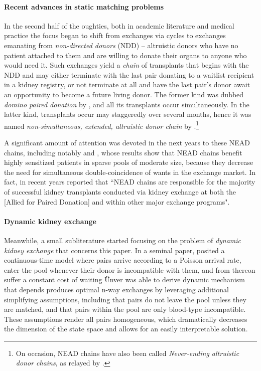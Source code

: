 \documentclass[12pt]{article}
\begin{document}
\paragraph{Recent advances in static matching problems} In the second half of the oughties, both in academic literature and medical practice the focus began to shift from exchanges via cycles to exchanges emanating from \emph{non-directed donors} (NDD) -- altruistic donors who have no patient attached to them and are willing to donate their organs to anyone who would need it. Such exchanges yield a \emph{chain} of transplants that begins with the NDD and may either terminate with the last pair donating to a waitlist recipient in a kidney registry, or not terminate at all and have the last pair's donor await an opportunity to become a future living donor. The former kind was dubbed \emph{domino paired donation} by \cite{montgomery2006domino}, and all its transplants occur simultaneously. In the latter kind, transplants occur may staggeredly over several months, hence it was named \emph{non-simultaneous, extended, altruistic donor chain} by \cite{rees2009nonsimultaneous}.\footnote{On occasion, NEAD chains have also been called \emph{Never-ending altruistic donor chains}, as relayed by \cite[p.~235-6]{roth2015gets}.}

A significant amount of attention was devoted in the next years to these NEAD chains, including notably \cite{ashlagi2011nonsimultaneous} and \cite{ashlagi2012need}, whose results show that NEAD chains benefit highly sensitized patients in sparse pools of moderate size, because they decrease the need for simultaneous double-coincidence of wants in the exchange market. In fact, in recent years \cite{anderson2015finding} reported that ``NEAD chains are responsible for the majority of successful kidney transplants conducted via kidney exchange at both the [Allied for Paired Donation] and within other major exchange programs".

\paragraph{Dynamic kidney exchange} Meanwhile, a small subliterature started focusing on the problem of \emph{dynamic kidney exchange} that concerns this paper. In a seminal paper, \cite{unver2010dynamic} posited a continuous-time model where pairs arrive according to a Poisson arrival rate, enter the pool whenever their donor is incompatible with them, and from thereon suffer a constant cost of waiting Ünver was able to derive dynamic mechanism that depends produces optimal n-way exchanges by leveraging additional simplifying assumptions, including that pairs do not leave the pool unless they are matched, and that pairs within the pool are only blood-type incompatible. These assumptions render all pairs homogeneous, which dramatically decreases the dimension of the state space and allows for an easily interpretable solution.
\end{document}
